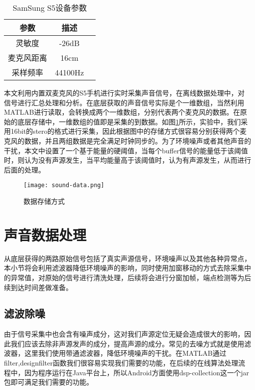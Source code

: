 \documentclass[winfonts]{njuthesis}
\begin{document}
		\begin{table}[htbp]
			\setlength{\belowcaptionskip}{7pt}
			\caption{SamSung S5设备参数}
			\centering
			\begin{tabular}{ccc}
				\hline 
				参数 & 描述 \\
				\hline
				灵敏度 & -26dB\\
				麦克风距离 & 16cm \\
				采样频率 & 44100Hz\\
				\hline
			\end{tabular} 
			\vspace{0.2cm}
			\label{table: parameters-of-S5}
		\end{table}
	
		本文利用内置双麦克风的S5手机进行实时采集声音信号，在离线数据处理中，对信号进行汇总处理和分析。在底层获取的声音信号实际是个一维数组，当然利用MATLAB进行读取，会转换成两个一维数组，分别代表两个麦克风的数据。在原始的底层存储中，一维数组的值即是采集的到数据。如图\ref{fig: sound-data}所示，实验中，我们采用16bit的stero的格式进行采集，因此根据图中的存储方式很容易分别获得两个麦克风的数据，并且两组数据是完全满足时钟同步的。为了环境噪声或者其他声音的干扰，本文中设置了一个基于能量的硬阈值，当每个buffer信号的能量低于该阈值时，则认为没有声源发生，当平均能量高于该阈值时，认为有声源发生，从而进行后面的处理。
		
		\begin{figure}[H]
			\centering
			\texttt{[image: sound-data.png]} 
			\caption{数据存储方式}
			\label{fig: sound-data}
		\end{figure}
		

	
	\section{声音数据处理}
	
		从底层获得的两路原始信号包括了真实声源信号，环境噪声以及其他各种异常点，本小节将会利用滤波器降低环境噪声的影响，同时使用加窗移动的方式去除采集中的异常值，对原始的信号进行清洗处理，后续将会进行分窗加帧，端点检测等为后续到达时间差做准备。

		\subsection{滤波除噪}
			
			由于信号采集中也会含有噪声成分，这对我们声源定位无疑会造成很大的影响，因此我们应该去除非声源发声的成分，提高声源的成分。常见的去噪方式就是使用滤波器，这里我们使用带通滤波器，降低环境噪声的干扰。在MATLAB通过filter,designfilter函数我们很容易实现我们需要的功能，在后续的在线算法处理流程中，因为程序运行在Java平台上，所以Android方面使用dsp-collection这一个jar包即可满足我们需要的功能。
			
\end{document}

